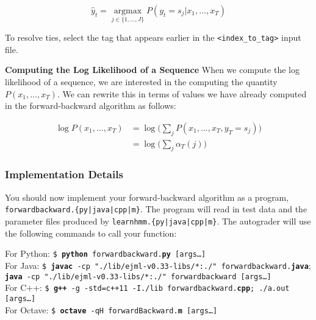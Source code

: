 \documentclass[11pt,addpoints,answers]{exam}
\numberwithin{equation}{section} %
\numberwithin{figure}{section} %
\numberwithin{table}{section} %
\newcommand \argmax {\operatorname*{argmax}}
\begin{document}
$$\hat{y}_t = \argmax_{j\in \{1,...,J\}} P(y_t = s_j\vert x_1,...,x_T)$$

To resolve ties, select the tag that appears earlier in the \texttt{<index\_to\_tag>} input file.

\textbf{Computing the Log Likelihood of a Sequence}
When we compute the log likelihood of a sequence, we are interested in the computing the quantity $P(x_1,...,x_T)$. We can rewrite this in terms of values we have already computed in the forward-backward algorithm as follows:

\begin{align*}
    \log P(x_1,...,x_T) &= \log\big(\sum_j P(x_1,...,x_T,y_T=s_j)\big)\\
    &= \log\big(\sum_j \alpha_T(j)\big)
\end{align*}

\subsubsection{Implementation Details}

You should now implement your forward-backward algorithm as a program, \texttt{forwardbackward.\{py|java|cpp|m\}}. The program will read in test data and the parameter files produced by \texttt{learnhmm.\{py|java|cpp|m\}}. The autograder will use the following commands to call your function:

\begin{tabbing}
For Python: \=\texttt{\$ \textbf{python} forwardbackward.\textbf{py} [args\dots]}\\
For Java: \>\texttt{\$ \textbf{javac} -cp "./lib/ejml-v0.33-libs/*:./" forwardbackward.\textbf{java}};\\ 
          \>\texttt{\textbf{java} -cp "./lib/ejml-v0.33-libs/*:./" forwardbackward [args\dots]}\\
For C++: \>\texttt{\$ \textbf{g++} -g -std=c++11 -I./lib forwardbackward.\textbf{cpp}; ./a.out [args\dots]}\\
For Octave: \>\texttt{\$ \textbf{octave} -qH forwardBackward.\textbf{m} [args\dots]}
\end{tabbing}
\end{document}
